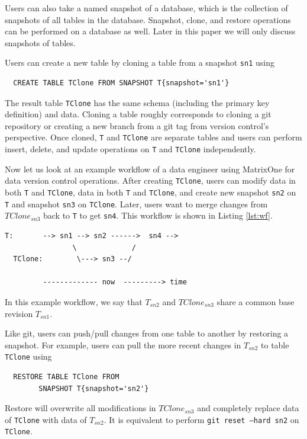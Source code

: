 \documentclass[sigconf,nonacm]{acmart} %
\begin{document}
Users can also take a named snapshot of a database, which is the collection of snapshots 
of all tables in the database.  Snapshot, clone, and restore operations can be performed
on a database as well.  Later in this paper we will only discuss snapshots of tables.

Users can create a new table by cloning a table from a snapshot \texttt{sn1} using 
\begin{verbatim}
  CREATE TABLE TClone FROM SNAPSHOT T{snapshot='sn1'}
\end{verbatim}
The result table \texttt{TClone} has the same schema (including 
the primary key definition) and data.  Cloning a table roughly 
corresponds to cloning a git repository or creating a new branch 
from a git tag from version control's perspective.  
Once cloned, \texttt{T} and \texttt{TClone} are 
separate tables and users can perform insert, delete, and update 
operations on \texttt{T} and \texttt{TClone} 
independently.  

Now let us look at an example workflow of a data engineer using MatrixOne
for data version control operations.   After creating \texttt{TClone}, 
users can modify data in both \texttt{T} and \texttt{TClone}, 
data in both \texttt{T} and \texttt{TClone}, and create new 
snapshot \texttt{sn2} on \texttt{T} and snapshot \texttt{sn3} 
on \texttt{TClone}.  Later, users want to merge changes 
from $TClone_{sn3}$ back to \texttt{T} to get 
\texttt{sn4}.  This workflow is shown in Listing \ref{lst:wf}.
\begin{lstlisting}[label=lst:wf,caption=Branching and Merging Workflow]
  T:       --> sn1 --> sn2 ------>  sn4 --> 
                \             /
  TClone:        \---> sn3 --/

         ------------- now  ---------> time
\end{lstlisting}
In this example workflow, we say that $T_{sn2}$ and $TClone_{sn3}$ 
share a common base revision $T_{sn1}$. 

Like git, users can push/pull changes from one table to another by 
restoring a snapshot.  For example, users can pull the more recent 
changes in $T_{sn2}$ to table \texttt{TClone} using 
\begin{verbatim}
  RESTORE TABLE TClone FROM
        SNAPSHOT T{snapshot='sn2'}
\end{verbatim}
Restore will overwrite all modifications in $TClone_{sn3}$ and completely replace 
data of \texttt{TClone} with data of $T_{sn2}$.  It is equivalent to perform 
\texttt{git reset --hard sn2} on \texttt{TClone}.
\end{document}
